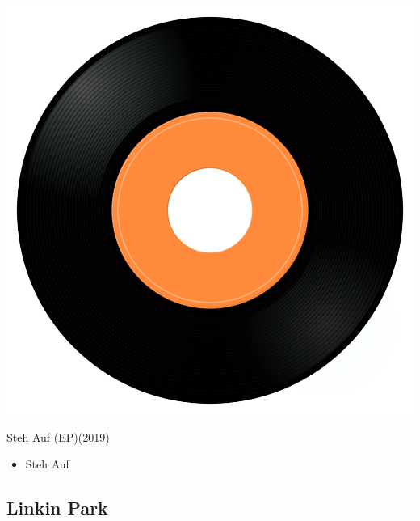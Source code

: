 \begin{minipage}[t]{0.25\textwidth}
\captionsetup{type=figure}
\includegraphics[width=\textwidth]{Images/cover.png}
\caption*{Steh Auf (EP)(2019)}
\end{minipage}
\begin{minipage}[t]{0.25\textwidth}\vspace{0pt}
\begin{itemize}[nosep,leftmargin=1em,labelwidth=*,align=left]
	\setlength{\itemsep}{0pt}
	\item Steh Auf
\end{itemize}
\end{minipage}

\subsection{Linkin Park}

